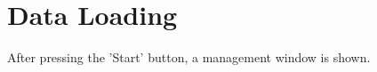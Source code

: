 \chapter{Data Loading}
\label{sec:data_loading} 

After pressing the 'Start' button, a management window is shown.




